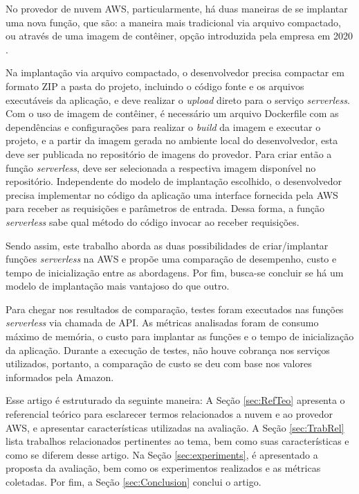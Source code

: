\documentclass[conference]{IEEEtran}
\begin{document}
No provedor de nuvem AWS, particularmente, há duas maneiras de se implantar uma nova função, que são: a maneira mais tradicional via arquivo compactado, ou através de uma imagem de contêiner, opção introduzida pela empresa em 2020 \cite{aws_2020_supports_container_image}.

Na implantação via arquivo compactado, o desenvolvedor precisa compactar em formato ZIP a pasta do projeto, incluindo o código fonte e os arquivos executáveis da aplicação, e deve realizar o \textit{upload} direto para o serviço \textit{serverless}. Com o uso de imagem de contêiner, é necessário um arquivo Dockerfile com as dependências e configurações para realizar o \textit{build} da imagem e executar o projeto, e a partir da imagem gerada no ambiente local do desenvolvedor, esta deve ser publicada no repositório de imagens do provedor. Para criar então a  função \textit{serverless}, deve ser selecionada a respectiva imagem disponível no repositório. 
Independente do modelo de implantação escolhido, o desenvolvedor precisa implementar no código da aplicação uma interface fornecida pela AWS para receber as requisições e parâmetros de entrada. Dessa forma, a função \textit{serverless} sabe qual método do código invocar ao receber requisições.

Sendo assim, este trabalho aborda as duas possibilidades de criar/implantar funções \textit{serverless} na AWS e propõe uma comparação de desempenho, custo e tempo de inicialização entre as abordagens. Por fim, busca-se concluir se há um modelo de implantação mais vantajoso do que outro.

Para chegar nos resultados de comparação, testes foram executados nas funções \textit{serverless} via chamada de API. As métricas analisadas foram de consumo máximo de memória, o custo para implantar as funções e o tempo de inicialização da aplicação. Durante a execução de testes, não houve cobrança nos serviços utilizados, portanto, a comparação de custo se deu com base nos valores informados pela Amazon.

Esse artigo é estruturado da seguinte maneira: A Seção \ref{sec:RefTeo} apresenta o referencial teórico para esclarecer termos relacionados a nuvem e ao provedor AWS, e apresentar características utilizadas na avaliação. A Seção \ref{sec:TrabRel} lista trabalhos relacionados pertinentes ao tema, bem como suas características e como se diferem desse artigo. Na Seção \ref{sec:experiments}, é apresentado a proposta da avaliação, bem como os experimentos realizados e as métricas coletadas. Por fim, a Seção \ref{sec:Conclusion} conclui o artigo.
\end{document}
